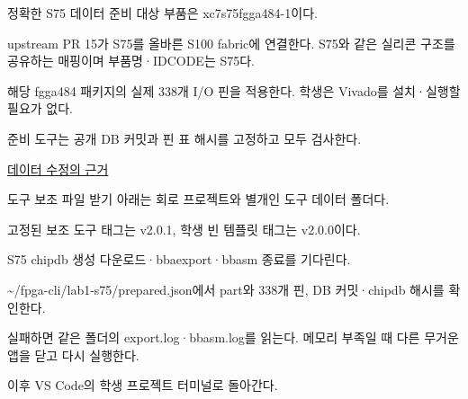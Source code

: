 \begin{frame}{정확한 S75 데이터 준비}\relax
\small
대상 부품은 xc7s75fgga484-1이다.\par\vspace{0.22cm}upstream PR 15가 S75를 올바른 S100 fabric에 연결한다. S75와 같은 실리콘 구조를 공유하는 매핑이며 부품명·IDCODE는 S75다.\par\vspace{0.22cm}해당 fgga484 패키지의 실제 338개 I/O 핀을 적용한다. 학생은 Vivado를 설치·실행할 필요가 없다.\par\vspace{0.22cm}준비 도구는 공개 DB 커밋과 핀 표 해시를 고정하고 모두 검사한다.\par\href{https://github.com/openXC7/prjxray-db/pull/15}{데이터 수정의 근거}
\end{frame}

\begin{frame}{도구 보조 파일 받기}\relax
\small
아래는 회로 프로젝트와 별개인 도구 데이터 폴더다.\par{}
고정된 보조 도구 태그는 v2.0.1, 학생 빈 템플릿 태그는 v2.0.0이다.\par
\end{frame}

\begin{frame}{S75 chipdb 생성}\relax
\small
{}
다운로드·bbaexport·bbasm 종료를 기다린다.\par\vspace{0.22cm}\textasciitilde{}/fpga-cli/lab1-s75/prepared.json에서 part와 338개 핀, DB 커밋·chipdb 해시를 확인한다.\par\vspace{0.22cm}실패하면 같은 폴더의 export.log·bbasm.log를 읽는다. 메모리 부족일 때 다른 무거운 앱을 닫고 다시 실행한다.\par\vspace{0.22cm}이후 VS Code의 학생 프로젝트 터미널로 돌아간다.\par
\end{frame}

